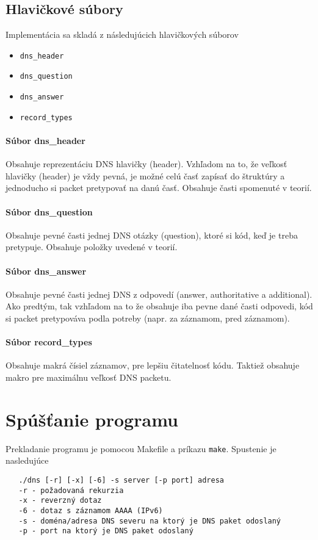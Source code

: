 \documentclass[titlepage]{article}
\begin{document}
\subsection{Hlavičkové súbory}
Implementácia sa skladá z následujúcich hlavičkových súborov
\begin{itemize}
    \item \verb|dns_header|
    \item \verb|dns_question|
    \item \verb|dns_answer|
    \item \verb|record_types|
\end{itemize}

\paragraph{Súbor dns\_header}
Obsahuje reprezentáciu DNS hlavičky (header). Vzhľadom na to, že veľkosť hlavičky (header) je vždy pevná, je možné 
celú časť zapísať do štruktúry a jednoducho si packet pretypovať na danú časť. Obsahuje časti spomenuté v teorií.

\paragraph{Súbor dns\_question}
Obsahuje pevné časti jednej DNS otázky (question), ktoré si kód, keď je treba pretypuje. Obsahuje položky uvedené v teorií.

\paragraph{Súbor dns\_answer}
Obsahuje pevné časti jednej DNS z odpovedí (answer, authoritative a additional). Ako predtým, tak vzhľadom na to že obsahuje iba
pevne dané časti odpovedi, kód si packet pretypováva podla potreby (napr. za záznamom, pred záznamom).

\paragraph{Súbor record\_types}
Obsahuje makrá čísiel záznamov, pre lepšiu čitatelnosť kódu. Taktiež obsahuje makro pre maximálnu veľkosť DNS packetu.

\newpage
\section{Spúšťanie programu}
Prekladanie programu je pomocou Makefile a príkazu \verb|make|.
Spustenie je nasledujúce
\begin{verbatim}
   ./dns [-r] [-x] [-6] -s server [-p port] adresa 
   -r - požadovaná rekurzia
   -x - reverzný dotaz
   -6 - dotaz s záznamom AAAA (IPv6)
   -s - doména/adresa DNS severu na ktorý je DNS paket odoslaný 
   -p - port na ktorý je DNS paket odoslaný
\end{verbatim}
\end{document}
